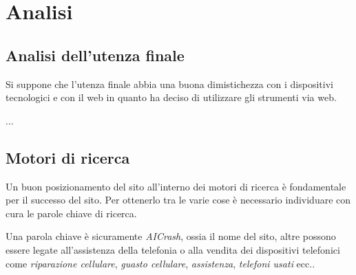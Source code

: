 \section{Analisi}

\subsection{Analisi dell'utenza finale}
Si suppone che l'utenza finale abbia una buona dimistichezza con i dispositivi tecnologici
e con il web in quanto ha deciso di utilizzare gli strumenti via web.

...

\subsection{Motori di ricerca}
Un buon posizionamento del sito all'interno dei motori di ricerca è
fondamentale per il successo del sito. Per ottenerlo tra le varie cose è
necessario individuare con cura le parole chiave di ricerca.

Una parola chiave è sicuramente \textit{AICrash}, ossia il nome del sito,
altre possono essere legate all'assistenza della telefonia o alla
vendita dei dispositivi telefonici come \textit{riparazione cellulare}, \textit{guasto cellulare},
\textit{assistenza}, \textit{telefoni usati} ecc..




